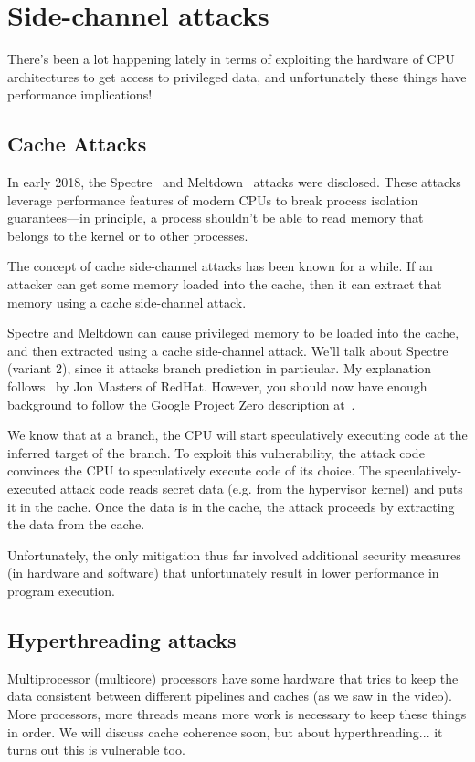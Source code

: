 \documentclass[a4paper]{report}
\begin{document}
\section*{Side-channel attacks}
There's been a lot happening lately in terms of exploiting the hardware of CPU architectures to get access to privileged data, and unfortunately these things have performance implications!

\subsection*{Cache Attacks}
In early 2018, the Spectre~\cite{Kocher2018spectre} and Meltdown~\cite{Lipp2018meltdown} attacks were disclosed. These attacks leverage performance features of modern CPUs to break process isolation guarantees---in principle, a process shouldn't be able to read memory that belongs to the kernel or to other processes.

The concept of cache side-channel attacks has been known for a while. If an attacker can get some memory loaded into the cache, then it can extract that memory using a cache side-channel attack.

Spectre and Meltdown can cause privileged memory to be loaded into the cache, and then extracted using a cache side-channel attack. We'll talk about Spectre (variant 2), since it attacks branch prediction in particular. My explanation follows~\cite{masters18:_what_meltd_spect} by Jon Masters of RedHat. However, you should now have enough background to follow the Google Project Zero description at~\cite{horn18:_readin}.

We know that at a branch, the CPU will start speculatively executing code at the inferred target of the branch. To exploit this vulnerability, the attack code convinces the CPU to speculatively execute code of its choice. The speculatively-executed attack code reads secret data (e.g. from the hypervisor kernel) and puts it in the cache. Once the data is in the cache, the attack proceeds by extracting the data from the cache.

Unfortunately, the only mitigation thus far involved additional security measures (in hardware and software) that unfortunately result in lower performance in program execution.

\subsection*{Hyperthreading attacks}
Multiprocessor (multicore) processors have some hardware that tries to keep the data consistent between different pipelines and caches (as we saw in the video). More processors, more threads means more work is necessary to keep these things in order. We will discuss cache coherence soon, but about hyperthreading... it turns out this is vulnerable too.
\end{document}
